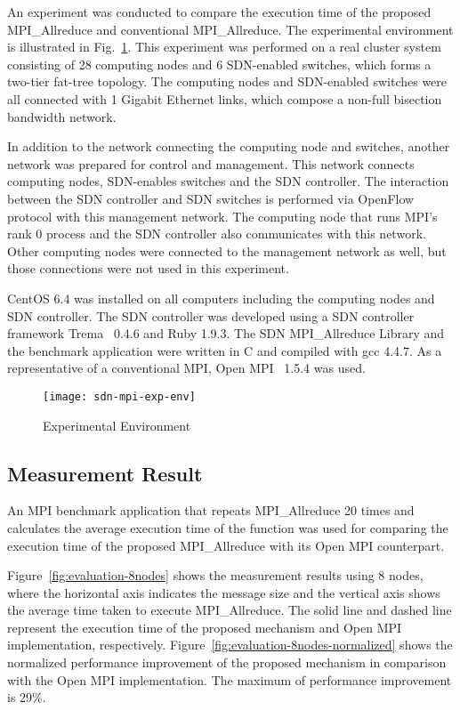 An experiment was conducted to compare the execution time of the
proposed MPI\_Allreduce and conventional
MPI\_Allreduce. The experimental environment is illustrated in
Fig.~\ref{fig:experiment-environment}. This experiment was performed on
a real cluster system consisting of 28 computing nodes and 6 SDN-enabled
switches, which forms a two-tier fat-tree topology. The computing nodes
and SDN-enabled switches were all connected with 1 Gigabit Ethernet
links, which compose a non-full bisection bandwidth network.

In addition to the network connecting the computing node and switches,
another network was prepared for control and management. This network
connects computing nodes, SDN-enables switches and the SDN controller.
The interaction between the SDN controller and SDN switches is performed
via OpenFlow protocol with this management network. The computing node
that runs MPI's rank 0 process and the SDN controller also communicates
with this network. Other computing nodes were connected to the
management network as well, but those connections were not used in this
experiment.

CentOS 6.4 was installed on all computers including the computing nodes and
SDN controller. The SDN controller was developed using a SDN controller
framework Trema~\autocite{trema} 0.4.6 and Ruby 1.9.3. The SDN
MPI\_Allreduce Library and the benchmark application were written in C and
compiled with gcc 4.4.7. As a representative of a conventional MPI,
Open MPI~\autocite{Gabriel2004} 1.5.4 was used.

\begin{figure}
    \centering
    \texttt{[image: sdn-mpi-exp-env]}
    \caption{Experimental Environment}%
    \label{fig:experiment-environment}
\end{figure}

\subsection{Measurement Result}

An MPI benchmark application that repeats MPI\_Allreduce 20
times and calculates the average execution time of the function was used
for comparing the execution time of the proposed MPI\_Allreduce
with its Open MPI counterpart.

Figure~\ref{fig:evaluation-8nodes} shows the measurement results using 8
nodes, where the horizontal axis indicates the message size and the
vertical axis shows the average time taken to execute
MPI\_Allreduce. The solid line and dashed line represent the
execution time of the proposed mechanism and Open MPI implementation,
respectively. Figure~\ref{fig:evaluation-8nodes-normalized} shows the
normalized performance improvement of the proposed mechanism in
comparison with the Open MPI implementation. The maximum of performance
improvement is 29\%.

